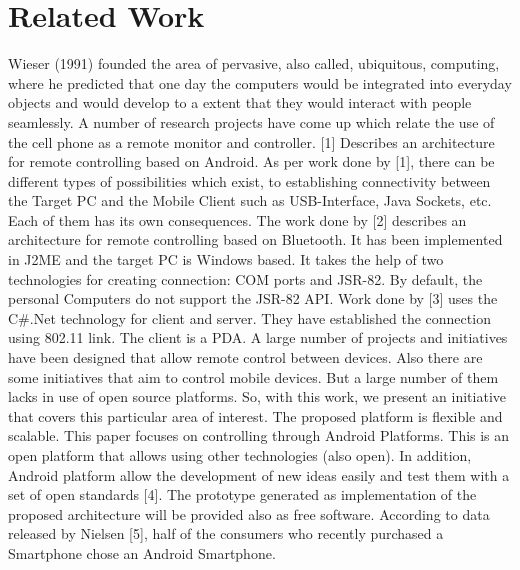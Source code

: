 \documentclass[10pt,conference,letterpaper]{IEEEtran}
\begin{document}
\section{Related Work}
Wieser (1991) founded the area of pervasive, also called, ubiquitous, computing, where he predicted that one day the computers would be integrated into everyday objects and would develop to a extent that they would interact with people seamlessly. A number of research projects have come up which relate the use of the cell phone as a remote monitor and controller. [1] Describes an architecture for remote controlling based on Android. As per work done by [1], there can be different types of possibilities which exist, to establishing connectivity between the Target PC and the Mobile Client such as USB-Interface, Java Sockets, etc. Each of them has its own consequences. The work done by [2] describes an architecture for remote controlling based on Bluetooth. It has been implemented in J2ME and the target PC is Windows based. It takes the help of two technologies for creating connection: COM ports and JSR-82. By default, the personal Computers do not support the JSR-82 API. Work done by [3] uses the C\#.Net technology for client and server. They have established the connection using 802.11 link. The client is a PDA. A large number of projects and initiatives have been designed that allow remote control between devices. Also there are some initiatives that aim to control mobile devices. But a large number of them lacks in use of open source platforms. So, with this work, we present an initiative that covers this particular area of interest.
The proposed platform is flexible and scalable. This paper focuses on controlling through Android Platforms. This is an open platform that allows using other technologies (also open). In addition, Android platform allow the development of new ideas easily and test them with a set of open standards [4]. The prototype generated as implementation of the proposed architecture will be provided also as free software. According to data released by Nielsen [5], half of the consumers who recently purchased a Smartphone chose an Android Smartphone. 
\end{document}
